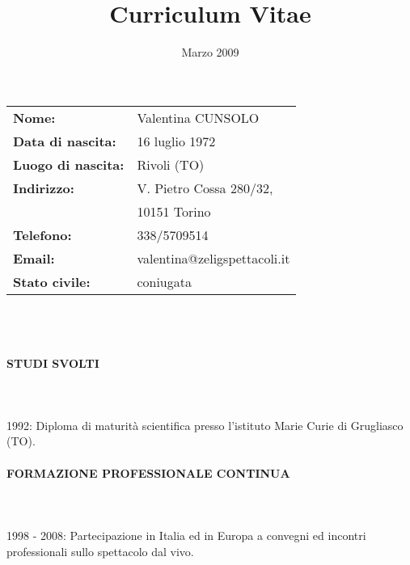 \documentclass[a4paper, 12pt]{article}
\begin{document}
\pagestyle{empty}

\title{Curriculum Vitae}
\date{Marzo 2009}
\maketitle

\begin{center}
\begin{tabular}{l l}
	\textbf{Nome: } & Valentina CUNSOLO\\
	\textbf{Data di nascita: } & 16 luglio 1972\\
	\textbf{Luogo di nascita: } & Rivoli (TO)\\
	\textbf{Indirizzo: } & V. Pietro Cossa 280/32, \\
				& 10151 Torino\\
	\textbf{Telefono: } & 338/5709514\\
	\textbf{Email: } & valentina@zeligspettacoli.it\\
	\textbf{Stato civile: } & coniugata\\
\end{tabular}
\end{center}

\ \\
\ \\
\paragraph{STUDI SVOLTI}
\ \\
\ \\
1992: Diploma di maturit\`a scientifica presso l'istituto Marie Curie di
Grugliasco (TO).
\\
\paragraph{FORMAZIONE PROFESSIONALE CONTINUA}
\ \\
\ \\
1998 - 2008: Partecipazione in Italia ed in Europa a convegni
ed incontri professionali sullo spettacolo dal vivo. 
\\
\end{document}
